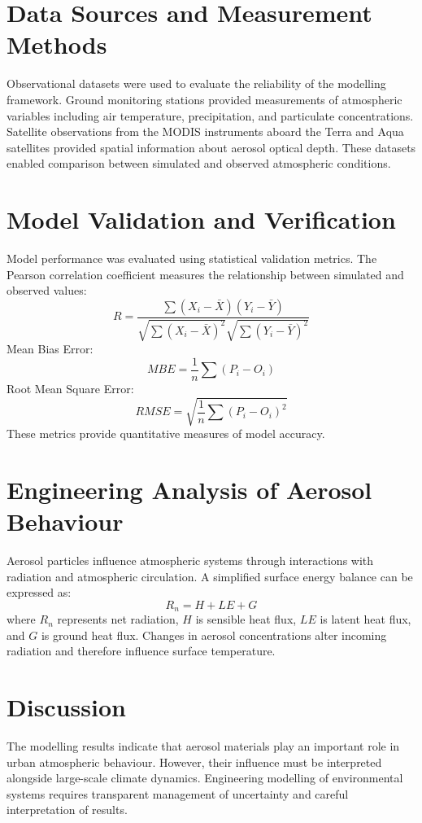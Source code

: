 \documentclass[12pt]{article}
\begin{document}
\section{Data Sources and Measurement Methods}
Observational datasets were used to evaluate the reliability of the modelling framework.
Ground monitoring stations provided measurements of atmospheric variables including air temperature, precipitation, and particulate concentrations.
Satellite observations from the MODIS instruments aboard the Terra and Aqua satellites provided spatial information about aerosol optical depth.
These datasets enabled comparison between simulated and observed atmospheric conditions.
\section{Model Validation and Verification}
Model performance was evaluated using statistical validation metrics.
The Pearson correlation coefficient measures the relationship between simulated and observed values:
\begin{equation}
R =
\frac{\sum (X_i - \bar X)(Y_i - \bar Y)}
{\sqrt{\sum (X_i - \bar X)^2}\sqrt{\sum (Y_i - \bar Y)^2}}
\end{equation}
Mean Bias Error:
\begin{equation}
MBE = \frac{1}{n}\sum (P_i - O_i)
\end{equation}
Root Mean Square Error:
\begin{equation}
RMSE = \sqrt{\frac{1}{n}\sum (P_i - O_i)^2}
\end{equation}
These metrics provide quantitative measures of model accuracy.
\section{Engineering Analysis of Aerosol Behaviour}
Aerosol particles influence atmospheric systems through interactions with radiation and atmospheric circulation.
A simplified surface energy balance can be expressed as:
\begin{equation}
R_n = H + LE + G
\end{equation}
where $R_n$ represents net radiation, $H$ is sensible heat flux, $LE$ is latent heat flux, and $G$ is ground heat flux.
Changes in aerosol concentrations alter incoming radiation and therefore influence surface temperature.
\section{Discussion}
The modelling results indicate that aerosol materials play an important role in urban atmospheric behaviour. However, their influence must be interpreted alongside large-scale climate dynamics.
Engineering modelling of environmental systems requires transparent management of uncertainty and careful interpretation of results.
\end{document}
